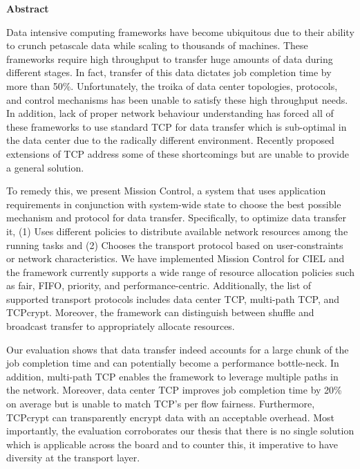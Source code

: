 \newpage
{\Huge \bf Abstract}
\vspace{24pt} 


Data intensive computing frameworks have become ubiquitous due to their ability
to crunch petascale data while scaling to thousands of machines. These
frameworks require high throughput to transfer huge amounts of data during
different stages. In fact, transfer of this data dictates job completion time by
more than 50\%. Unfortunately, the troika of data center topologies, protocols,
and control mechanisms has been unable to satisfy these high throughput needs.
In addition, lack of proper network behaviour understanding has forced all of
these frameworks to use standard TCP for data transfer which is sub-optimal in
the data center due to the radically different environment. Recently proposed
extensions of TCP address some of these shortcomings but are unable to provide a
general solution.

To remedy this, we present Mission Control, a system that uses application
requirements in conjunction with system-wide state to choose the best possible
mechanism and protocol for data transfer. Specifically, to optimize data
transfer it, (1) Uses different policies to distribute available network
resources among the running tasks and (2) Chooses the transport protocol based
on user-constraints or network characteristics. We have implemented Mission
Control for CIEL and the framework currently supports a wide range of resource
allocation policies such as fair, FIFO, priority, and performance-centric.
Additionally, the list of supported transport protocols includes data center
TCP, multi-path TCP, and TCPcrypt. Moreover, the framework can distinguish
between shuffle and broadcast transfer to appropriately allocate resources.

Our evaluation shows that data transfer indeed accounts for a large chunk of the
job completion time and can potentially become a performance bottle-neck. In
addition, multi-path TCP enables the framework to leverage multiple paths in
the network. Moreover, data center TCP improves job completion time by 20\% on
average but is unable to match TCP's per flow fairness. Furthermore, TCPcrypt
can transparently encrypt data with an acceptable overhead. Most importantly,
the evaluation corroborates our thesis that there is no single solution which is
applicable across the board and to counter this, it imperative to have diversity
at the transport layer.



\newpage
\vspace*{\fill}
